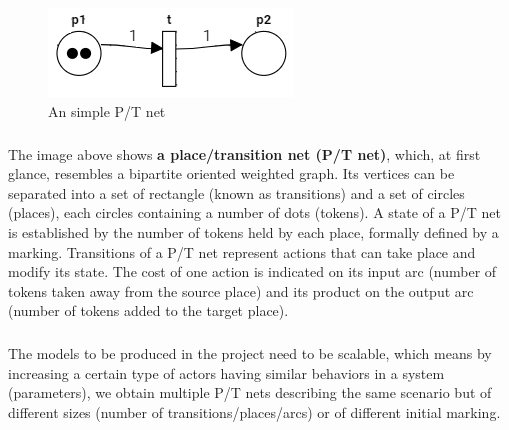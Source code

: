 \documentclass{article}
\begin{document}
	\begin{figure}[h]
		\centering
		\vspace*{-10pt}
		\includegraphics[scale=0.6]{net1}
		\caption{An simple P/T net}
		\vspace*{-10pt}
	\end{figure}
	\subparagraph{}
	The image above shows \textbf{a place/transition net (P/T net)}, which, at first glance, resembles a bipartite oriented weighted graph. Its vertices can be separated into a set of rectangle (known as transitions) and a set of circles (places), each circles containing a number of dots (tokens). A state of a P/T net is established by the number of tokens held by each place, formally defined by a marking. Transitions of a P/T net represent actions that can take place and modify its state. The cost of one action is indicated on its input arc (number of tokens taken away from the source place) and its product on the output arc (number of tokens added to the target place).
	\subparagraph{}The models to be produced in the project need to be scalable, which means by increasing a certain type of actors having similar behaviors in a system (parameters), we obtain multiple P/T nets describing the same scenario but of different sizes (number of transitions/places/arcs) or of different initial marking.
\end{document}

